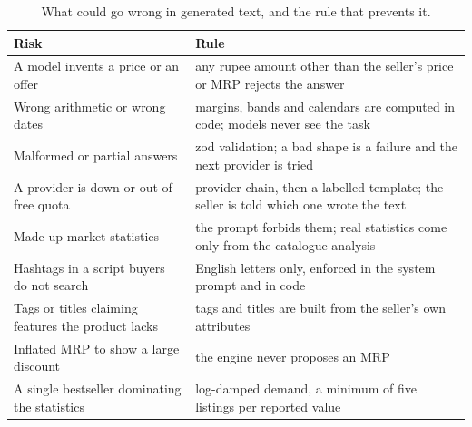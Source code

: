 \begin{table}[!htbp]
\centering
\caption{What could go wrong in generated text, and the rule that prevents it.}
\label{tab:textguard}
\small
\begin{tabularx}{\linewidth}{@{}L{55mm}Y@{}}
\toprule
\textbf{Risk} & \textbf{Rule}\\
\midrule
A model invents a price or an offer & any rupee amount other than the seller's price or MRP rejects the answer\\
Wrong arithmetic or wrong dates & margins, bands and calendars are computed in code; models never see the task\\
Malformed or partial answers & zod validation; a bad shape is a failure and the next provider is tried\\
A provider is down or out of free quota & provider chain, then a labelled template; the seller is told which one wrote the text\\
Made-up market statistics & the prompt forbids them; real statistics come only from the catalogue analysis\\
Hashtags in a script buyers do not search & English letters only, enforced in the system prompt and in code\\
Tags or titles claiming features the product lacks & tags and titles are built from the seller's own attributes\\
Inflated MRP to show a large discount & the engine never proposes an MRP\\
A single bestseller dominating the statistics & log-damped demand, a minimum of five listings per reported value\\
\bottomrule
\end{tabularx}
\end{table}
